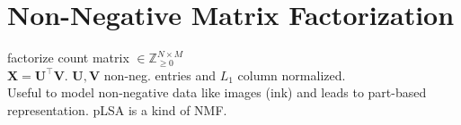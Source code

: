 \section*{Non-Negative Matrix Factorization}
factorize count matrix $\mathbf{}\in\mathbb{Z}_{\geq 0}^{N\times M}$\\
$\mathbf{X}=\mathbf{U}^\top\mathbf{V}$. $\mathbf{U},\mathbf{V}$ non-neg. entries and $L_1$ column normalized.\\
Useful to model non-negative data like images (ink) and leads to part-based representation.
pLSA is a kind of NMF.
